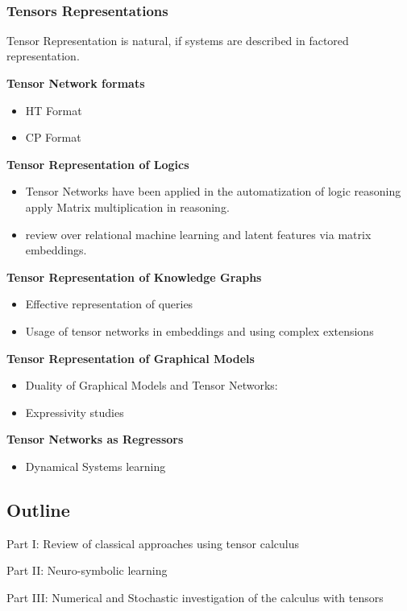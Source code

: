  


\subsubsection{Tensors Representations}

Tensor Representation is natural, if systems are described in factored representation.

\textbf{Tensor Network formats}
\begin{itemize}
	\item HT Format \cite{hackbusch_scheme_2009}
	\item CP Format 
\end{itemize}


\textbf{Tensor Representation of Logics}
\begin{itemize}
	\item Tensor Networks have been applied in the automatization of logic reasoning \cite{li_linear_2017, sato_linear_2017} apply Matrix multiplication in reasoning.
	\item \cite{nickel_review_2016} review over relational machine learning and latent features via matrix embeddings.
\end{itemize}

\textbf{Tensor Representation of Knowledge Graphs}
\begin{itemize}
	\item Effective representation of queries 
	\item Usage of tensor networks in embeddings \cite{yang_embedding_2015} and using complex extensions \cite{trouillon_complex_2017, trouillon_knowledge_2017}
\end{itemize}


\textbf{Tensor Representation of Graphical Models}
\begin{itemize}
	\item Duality of Graphical Models and Tensor Networks:
\cite{robeva_duality_2019}
	\item Expressivity studies \cite{glasser_expressive_2019}
\end{itemize}



\textbf{Tensor Networks as Regressors}
\begin{itemize}
	\item Dynamical Systems learning \cite{gels_multidimensional_2019, goesmann_tensor_2020}
\end{itemize}





\subsection{Outline}

Part I: Review of classical approaches using tensor calculus

Part II: Neuro-symbolic learning

Part III: Numerical and Stochastic investigation of the calculus with tensors

